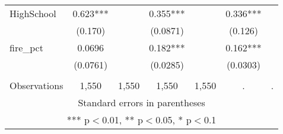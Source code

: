 \begin{tabular}{lcccccc}
HighSchool & 0.623*** &  & 0.355*** &  & 0.336*** &  \\
 & (0.170) &  & (0.0871) &  & (0.126) &  \\
fire\_pct & 0.0696 &  & 0.182*** &  & 0.162*** &  \\
 & (0.0761) &  & (0.0285) &  & (0.0303) &  \\
 &  &  &  &  &  &  \\
 Observations & 1,550 & 1,550 & 1,550 & 1,550 & . & . \\ \hline
\multicolumn{7}{c}{ Standard errors in parentheses} \\
\multicolumn{7}{c}{ *** p$<$0.01, ** p$<$0.05, * p$<$0.1} \\
\end{tabular}
